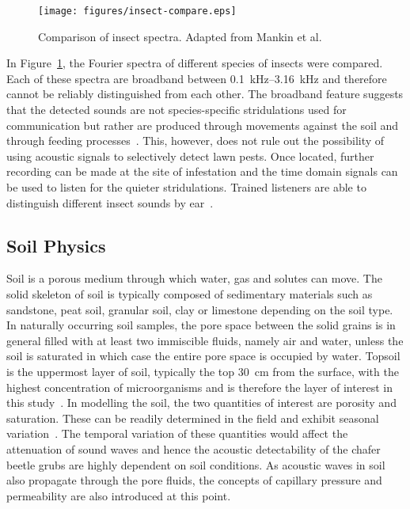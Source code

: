 \documentclass[twocolumn]{article}
\begin{document}
\begin{figure}
    \centering
    \texttt{[image: figures/insect-compare.eps]}
    \caption{Comparison of insect spectra. Adapted from Mankin et al.~\cite{mankin_mccoy_shapiro_1998}}
    \label{fig:insect-compare}
\end{figure}

In Figure~\ref{fig:insect-compare}, the Fourier spectra of different species of insects were compared. Each of these spectra are broadband between \SIrange{0.1}{3.16}{\kilo\hertz} and therefore cannot be reliably distinguished from each other. The broadband feature suggests that the detected sounds are not species-specific stridulations used for communication but rather are produced through movements against the soil and through feeding processes~\cite{mankin_mccoy_shapiro_1998}. This, however, does not rule out the possibility of using acoustic signals to selectively detect lawn pests. Once located, further recording can be made at the site of infestation and the time domain signals can be used to listen for the quieter stridulations. Trained listeners are able to distinguish different insect sounds by ear~\cite{mankin_hubbard_weaver_2000}.

\subsection{Soil Physics}
Soil is a porous medium through which water, gas and solutes can move. The solid skeleton of soil is typically composed of sedimentary materials such as sandstone, peat soil, granular soil, clay or limestone depending on the soil type. In naturally occurring soil samples, the pore space between the solid grains is in general filled with at least two immiscible fluids, namely air and water, unless the soil is saturated in which case the entire pore space is occupied by water. Topsoil is the uppermost layer of soil, typically the top \SI{30}{cm} from the surface, with the highest concentration of microorganisms and is therefore the layer of interest in this study~\cite{arrouays_deslais_badeau_2006}. In modelling the soil, the two quantities of interest are porosity and saturation. These can be readily determined in the field and exhibit seasonal variation~\cite{castiglioni_sasal_wilson_oszust_2018}. The temporal variation of these quantities would affect the attenuation of sound waves and hence the acoustic detectability of the chafer beetle grubs are highly dependent on soil conditions. As acoustic waves in soil also propagate through the pore fluids, the concepts of capillary pressure and permeability are also introduced at this point.
\end{document}

